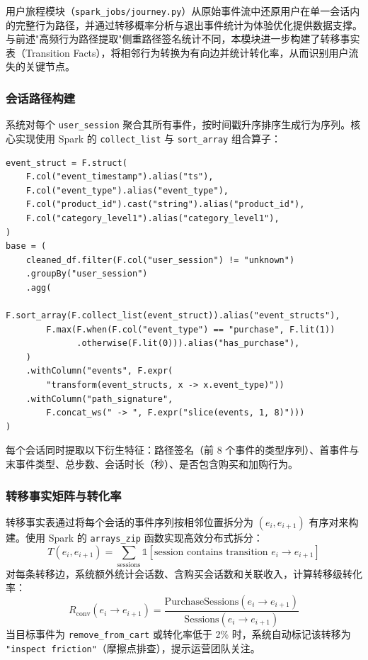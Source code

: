 用户旅程模块（\texttt{spark\_jobs/journey.py}）从原始事件流中还原用户在单一会话内的完整行为路径，并通过转移概率分析与退出事件统计为体验优化提供数据支撑。与前述"高频行为路径提取"侧重路径签名统计不同，本模块进一步构建了转移事实表（Transition Facts），将相邻行为转换为有向边并统计转化率，从而识别用户流失的关键节点。

\subsubsection{会话路径构建}

系统对每个 \texttt{user\_session} 聚合其所有事件，按时间戳升序排序生成行为序列。核心实现使用 Spark 的 \texttt{collect\_list} 与 \texttt{sort\_array} 组合算子：

\begin{lstlisting}[style=codexcode]
event_struct = F.struct(
    F.col("event_timestamp").alias("ts"),
    F.col("event_type").alias("event_type"),
    F.col("product_id").cast("string").alias("product_id"),
    F.col("category_level1").alias("category_level1"),
)
base = (
    cleaned_df.filter(F.col("user_session") != "unknown")
    .groupBy("user_session")
    .agg(
        F.sort_array(F.collect_list(event_struct)).alias("event_structs"),
        F.max(F.when(F.col("event_type") == "purchase", F.lit(1))
              .otherwise(F.lit(0))).alias("has_purchase"),
    )
    .withColumn("events", F.expr(
        "transform(event_structs, x -> x.event_type)"))
    .withColumn("path_signature",
        F.concat_ws(" -> ", F.expr("slice(events, 1, 8)")))
)
\end{lstlisting}

每个会话同时提取以下衍生特征：路径签名（前 8 个事件的类型序列）、首事件与末事件类型、总步数、会话时长（秒）、是否包含购买和加购行为。

\subsubsection{转移事实矩阵与转化率}

转移事实表通过将每个会话的事件序列按相邻位置拆分为 $(e_i, e_{i+1})$ 有序对来构建。使用 Spark 的 \texttt{arrays\_zip} 函数实现高效分布式拆分：
\begin{equation}
    T(e_i, e_{i+1}) = \sum_{\text{sessions}} \mathbb{1}[\text{session contains transition } e_i \to e_{i+1}]
    \label{eq:transition-count}
\end{equation}
对每条转移边，系统额外统计会话数、含购买会话数和关联收入，计算转移级转化率：
\begin{equation}
    R_{\text{conv}}(e_i \to e_{i+1}) = \frac{\text{PurchaseSessions}(e_i \to e_{i+1})}{\text{Sessions}(e_i \to e_{i+1})}
    \label{eq:transition-conversion}
\end{equation}
当目标事件为 \texttt{remove\_from\_cart} 或转化率低于 2\% 时，系统自动标记该转移为 \texttt{"inspect friction"}（摩擦点排查），提示运营团队关注。

